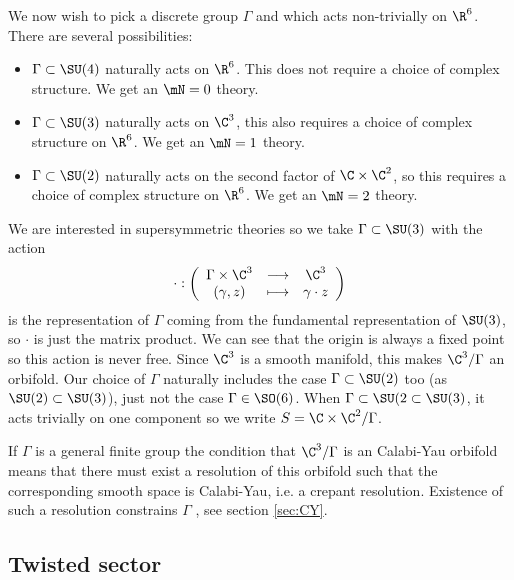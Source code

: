 \documentclass{worksheetclass}
\begin{document}
        We now wish to pick a discrete group $\Gamma$ and which acts non-trivially on $\R^6$. There are several possibilities:
        \begin{itemize}
            \item $\Gamma\subset\SU(4)$ naturally acts on $\R^6$. This does not require a choice of complex structure. We get an $\mN=0$ theory.
            \item $\Gamma\subset\SU(3)$ naturally acts on $\C^3$, this also requires a choice of complex structure on $\R^6$. We get an $\mN=1$ theory.
            \item $\Gamma\subset\SU(2)$ naturally acts on the second factor of $\C\times\C^2$, so this requires a choice of complex structure on $\R^6$. We get an $\mN=2$ theory.
        \end{itemize}

        We are interested in supersymmetric theories so we take $\Gamma\subset\SU(3)$ with the action
        \begin{equation}
            \cdot:\left(
            \begin{array}{ccc}
                \Gamma\times\C^3 & \longrightarrow & \C^3 \\
                (\gamma,z) & \longmapsto & \gamma\cdot z
            \end{array}
            \right)
        \end{equation}
        is the representation of $\Gamma$ coming from the fundamental representation of $\SU(3)$, so $\cdot$ is just the matrix product. We can see that the origin is always a fixed point so this action is never free. Since $\C^3$ is a smooth manifold, this makes $\C^3/\Gamma$ an orbifold. Our choice of $\Gamma$ naturally includes the case $\Gamma\subset\SU(2)$ too (as $\SU(2)\subset\SU(3)$), just not the case $\Gamma\in\SO(6)$. When $\Gamma\subset\SU(2\subset\SU(3)$, it acts trivially on one component so we write $S=\C\times\C^2/\Gamma$.

        If $\Gamma$ is a general finite group the condition that $\C^3/\Gamma$ is an Calabi-Yau orbifold means that there must exist a resolution of this orbifold such that the corresponding smooth space is Calabi-Yau, i.e. a crepant resolution. Existence of such a resolution constrains $\Gamma$ , see section \ref{sec:CY}.

    
    \subsection{Twisted sector}
\end{document}
